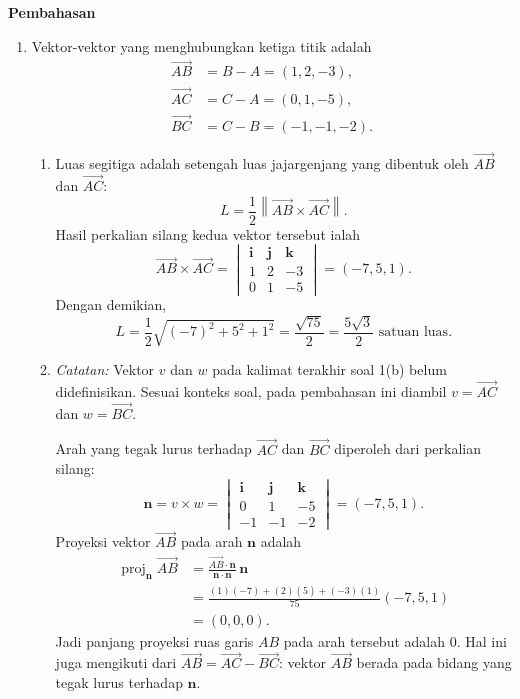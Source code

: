 \documentclass[11pt,a4paper]{article}
\newcommand{\vect}[1]{\overrightarrow{#1}}
\begin{document}
\newpage

\begin{center}
    {\Large\bfseries Pembahasan}
\end{center}

\begin{enumerate}
\item 
Vektor-vektor yang menghubungkan ketiga titik adalah
\begin{align*}
    \vect{AB}&=B-A=(1,2,-3),\\
    \vect{AC}&=C-A=(0,1,-5),\\
    \vect{BC}&=C-B=(-1,-1,-2).
\end{align*}

\begin{enumerate}
\item Luas segitiga adalah setengah luas jajargenjang yang dibentuk oleh
$\vect{AB}$ dan $\vect{AC}$:
\[
    L=\frac12\left\|\vect{AB}\times\vect{AC}\right\|.
\]
Hasil perkalian silang kedua vektor tersebut ialah
\[
    \vect{AB}\times\vect{AC}
    =\begin{vmatrix}
        \mathbf{i} & \mathbf{j} & \mathbf{k} \\
        1 & 2 & -3 \\
        0 & 1 & -5
    \end{vmatrix}
    =(-7,5,1).
\]
Dengan demikian,
\[
    L=\frac12\sqrt{(-7)^2+5^2+1^2}
     =\frac{\sqrt{75}}2
     =\boxed{\frac{5\sqrt{3}}2\text{ satuan luas}}.
\]

\item \textit{Catatan:} Vektor $v$ dan $w$ pada kalimat terakhir soal 1(b)
belum didefinisikan. Sesuai konteks soal, pada pembahasan ini diambil
$v=\vect{AC}$ dan $w=\vect{BC}$.

Arah yang tegak lurus terhadap $\vect{AC}$ dan $\vect{BC}$ diperoleh dari
perkalian silang:
\[
    \mathbf{n}=v\times w
    =\begin{vmatrix}
        \mathbf{i} & \mathbf{j} & \mathbf{k} \\
        0 & 1 & -5 \\
        -1 & -1 & -2
    \end{vmatrix}
    =(-7,5,1).
\]
Proyeksi vektor $\vect{AB}$ pada arah $\mathbf{n}$ adalah
\begin{align*}
    \operatorname{proj}_{\mathbf{n}}\vect{AB}
    &=\frac{\vect{AB}\cdot\mathbf{n}}{\mathbf{n}\cdot\mathbf{n}}
      \,\mathbf{n}\\
    &=\frac{(1)(-7)+(2)(5)+(-3)(1)}{75}(-7,5,1)\\
    &=\boxed{(0,0,0)}.
\end{align*}
Jadi panjang proyeksi ruas garis $AB$ pada arah tersebut adalah
$\boxed{0}$. Hal ini juga mengikuti dari
$\vect{AB}=\vect{AC}-\vect{BC}$: vektor $\vect{AB}$ berada pada bidang
yang tegak lurus terhadap $\mathbf{n}$.


\end{enumerate}
\end{enumerate}
\end{document}
